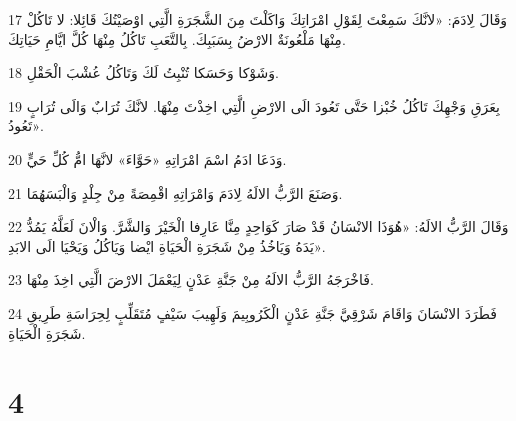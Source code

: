 \par 17 وَقَالَ لِادَمَ: «لانَّكَ سَمِعْتَ لِقَوْلِ امْرَاتِكَ وَاكَلْتَ مِنَ الشَّجَرَةِ الَّتِي اوْصَيْتُكَ قَائِلا: لا تَاكُلْ مِنْهَا مَلْعُونَةٌ الارْضُ بِسَبَبِكَ. بِالتَّعَبِ تَاكُلُ مِنْهَا كُلَّ ايَّامِ حَيَاتِكَ.
\par 18 وَشَوْكا وَحَسَكا تُنْبِتُ لَكَ وَتَاكُلُ عُشْبَ الْحَقْلِ.
\par 19 بِعَرَقِ وَجْهِكَ تَاكُلُ خُبْزا حَتَّى تَعُودَ الَى الارْضِ الَّتِي اخِذْتَ مِنْهَا. لانَّكَ تُرَابٌ وَالَى تُرَابٍ تَعُودُ».
\par 20 وَدَعَا ادَمُ اسْمَ امْرَاتِهِ «حَوَّاءَ» لانَّهَا امُّ كُلِّ حَيٍّ.
\par 21 وَصَنَعَ الرَّبُّ الالَهُ لِادَمَ وَامْرَاتِهِ اقْمِصَةً مِنْ جِلْدٍ وَالْبَسَهُمَا.
\par 22 وَقَالَ الرَّبُّ الالَهُ: «هُوَذَا الانْسَانُ قَدْ صَارَ كَوَاحِدٍ مِنَّا عَارِفا الْخَيْرَ وَالشَّرَّ. وَالْانَ لَعَلَّهُ يَمُدُّ يَدَهُ وَيَاخُذُ مِنْ شَجَرَةِ الْحَيَاةِ ايْضا وَيَاكُلُ وَيَحْيَا الَى الابَدِ».
\par 23 فَاخْرَجَهُ الرَّبُّ الالَهُ مِنْ جَنَّةِ عَدْنٍ لِيَعْمَلَ الارْضَ الَّتِي اخِذَ مِنْهَا.
\par 24 فَطَرَدَ الانْسَانَ وَاقَامَ شَرْقِيَّ جَنَّةِ عَدْنٍ الْكَرُوبِيمَ وَلَهِيبَ سَيْفٍ مُتَقَلِّبٍ لِحِرَاسَةِ طَرِيقِ شَجَرَةِ الْحَيَاةِ.

\chapter{4}


